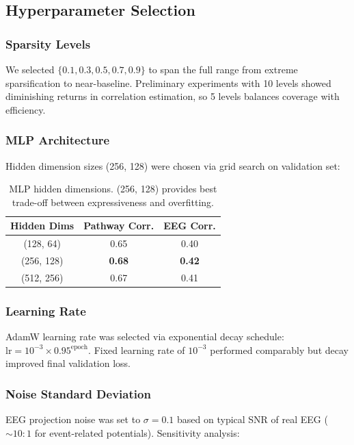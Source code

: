 \subsection{Hyperparameter Selection}

\subsubsection{Sparsity Levels}

We selected $\{0.1, 0.3, 0.5, 0.7, 0.9\}$ to span the full range from extreme sparsification to near-baseline. Preliminary experiments with 10 levels showed diminishing returns in correlation estimation, so 5 levels balances coverage with efficiency.

\subsubsection{MLP Architecture}

Hidden dimension sizes (256, 128) were chosen via grid search on validation set:

\begin{table}[H]
\centering
\small
\begin{tabular}{ccc}
\toprule
\textbf{Hidden Dims} & \textbf{Pathway Corr.} & \textbf{EEG Corr.} \\
\midrule
(128, 64) & 0.65 & 0.40 \\
(256, 128) & \textbf{0.68} & \textbf{0.42} \\
(512, 256) & 0.67 & 0.41 \\
\bottomrule
\end{tabular}
\caption{MLP hidden dimensions. (256, 128) provides best trade-off between expressiveness and overfitting.}
\end{table}

\subsubsection{Learning Rate}

AdamW learning rate was selected via exponential decay schedule: $\text{lr} = 10^{-3} \times 0.95^{\text{epoch}}$. Fixed learning rate of $10^{-3}$ performed comparably but decay improved final validation loss.

\subsubsection{Noise Standard Deviation}

EEG projection noise was set to $\sigma = 0.1$ based on typical SNR of real EEG ($\sim 10:1$ for event-related potentials). Sensitivity analysis:

